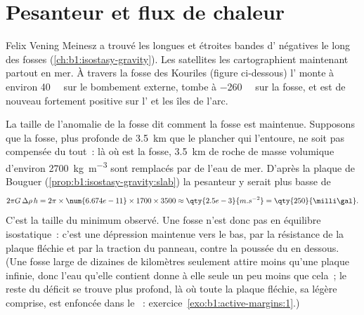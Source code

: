 \section{Pesanteur et flux de chaleur}\label{sec:b1:active-margins:gravity-heat}

Felix Vening Meinesz a trouvé les longues et étroites bandes d' négatives
le long des fosses (\cref{ch:b1:isostasy-gravity}). Les satellites les cartographient maintenant
partout en mer. À travers la fosse des Kouriles (figure ci-dessous) l'
monte à environ \qty{40}{\milli\gal} sur le bombement externe, tombe à
\qty{-260}{\milli\gal} sur la fosse, et est de nouveau fortement positive sur
l' et les îles de l'arc.

La taille de l'anomalie de la fosse dit comment la fosse est maintenue. Supposons que la fosse,
plus profonde de \qty{3.5}{km} que le plancher qui l'entoure, ne soit pas compensée du tout~:
là où est la fosse, \qty{3.5}{km} de roche de masse volumique d'environ
\qty{2700}{kg.m^{-3}} sont remplacés par de l'eau de mer. D'après la plaque de Bouguer
(\cref{prop:b1:isostasy-gravity:slab}) la pesanteur y serait plus basse de
\[
  2\pi G\,\Delta\rho\,h = 2\pi \times \num{6.674e-11} \times 1700 \times 3500
  \approx \qty{2.5e-3}{m.s^{-2}} = \qty{250}{\milli\gal} .
\]
C'est la taille du minimum observé. Une fosse n'est donc pas en équilibre isostatique~:
c'est une dépression maintenue vers le bas, par la résistance de la plaque fléchie
et par la traction du panneau, contre la poussée du  en dessous. (Une
fosse large de dizaines de kilomètres seulement attire moins qu'une plaque infinie, donc
l'eau qu'elle contient donne à elle seule un peu moins que cela~; le reste du déficit
se trouve plus profond, là où toute la plaque fléchie, sa  légère comprise, est enfoncée
dans le ~: exercice~\ref{exo:b1:active-margins:1}.)

